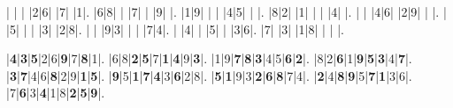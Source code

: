 \documentclass[10pt,a4paper]{article}
\begin{document}
\begin{sudoku}
| | | |2|6| |7| |1|.
|6|8| | |7| | |9| |.
|1|9| | | |4|5| | |.
|8|2| |1| | | |4| |.
| | |4|6| |2|9| | |.
| |5| | | |3| |2|8|.
| | |9|3| | | |7|4|.
| |4| | |5| | |3|6|.
|7| |3| |1|8| | | |.
\end{sudoku}
\begin{sudoku}
|{\bf\color{Orange}4}|{\bf\color{Orange}3}|{\bf\color{Orange}5}|2|6|{\bf\color{Orange}9}|7|{\bf\color{Orange}8}|1|.
|6|8|{\bf\color{Orange}2}|{\bf\color{Orange}5}|7|{\bf\color{Orange}1}|{\bf\color{Orange}4}|9|{\bf\color{Orange}3}|.
|1|9|{\bf\color{Orange}7}|{\bf\color{Orange}8}|{\bf\color{Orange}3}|4|5|{\bf\color{Orange}6}|{\bf\color{Orange}2}|.
|8|2|{\bf\color{Orange}6}|1|{\bf\color{Orange}9}|{\bf\color{Orange}5}|{\bf\color{Orange}3}|4|{\bf\color{Orange}7}|.
|{\bf\color{Orange}3}|{\bf\color{Orange}7}|4|6|{\bf\color{Orange}8}|2|9|{\bf\color{Orange}1}|{\bf\color{Orange}5}|.
|{\bf\color{Orange}9}|5|{\bf\color{Orange}1}|{\bf\color{Orange}7}|{\bf\color{Orange}4}|3|{\bf\color{Orange}6}|2|8|.
|{\bf\color{Orange}5}|{\bf\color{Orange}1}|9|3|{\bf\color{Orange}2}|{\bf\color{Orange}6}|{\bf\color{Orange}8}|7|4|.
|{\bf\color{Orange}2}|4|{\bf\color{Orange}8}|{\bf\color{Orange}9}|5|{\bf\color{Orange}7}|{\bf\color{Orange}1}|3|6|.
|7|{\bf\color{Orange}6}|3|{\bf\color{Orange}4}|1|8|{\bf\color{Orange}2}|{\bf\color{Orange}5}|{\bf\color{Orange}9}|.
\end{sudoku}
\end{document}
